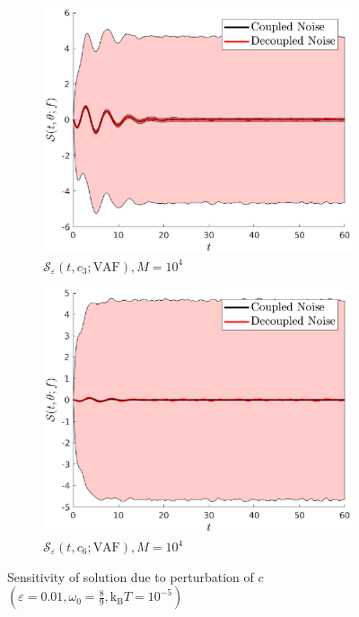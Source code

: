 \documentclass[a4paper,10pt]{beamer}
\newcommand{\rb}[1]{\left( #1 \right)}
\begin{document}
\begin{frame}
\begin{figure}[H]
\begin{subfigure}{0.32\linewidth}
			\end{subfigure}
			\begin{subfigure}{0.32\linewidth}
				\includegraphics[width=\linewidth]{./Plots/sensitivityAnalysis/c3M10000.eps}
				\caption{\tiny $\mathcal{S}_{\varepsilon} \rb{t,c_{3};\text{VAF}}, M = 10^{4}$}
			\end{subfigure}
			\begin{subfigure}{0.32\linewidth}
				\includegraphics[width=\linewidth]{./Plots/sensitivityAnalysis/c6M10000.eps}
				\caption{\tiny $\mathcal{S}_{\varepsilon} \rb{t,c_{6};\text{VAF}}, M = 10^{4}$}
			\end{subfigure}
			\caption{\scriptsize Sensitivity of solution due to perturbation of $c$ $\rb{\varepsilon = 0.01, \omega_{0} = \frac{8}{9}, \text{k}_{\text{B}} T = 10^{-5}}$}
		\end{figure}
	\end{frame}
\end{document}
